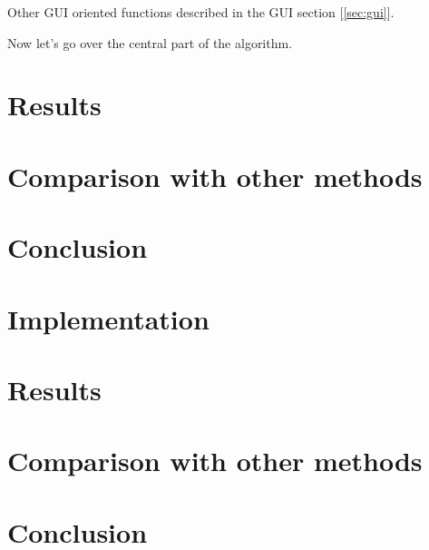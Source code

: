 \documentclass[10pt,twoside,a4paper]{article}
\begin{document}
Other GUI oriented functions described in the GUI section [\ref*{sec:gui}].

Now let's go over the central part of the algorithm.



\section{Results}\label{sec:results}
\section{Comparison with other methods}\label{sec:comparison}
\section{Conclusion}\label{sec:conclusion}
\cite{BL22}
\cite{CHF20}
\cite{KLL+19}
\cite{LRGC22}
\cite{NMBP20}
\section{Implementation}\label{sec:implementation}
\section{Results}\label{sec:results}
\section{Comparison with other methods}\label{sec:comparison}
\section{Conclusion}\label{sec:conclusion}



\end{document}
